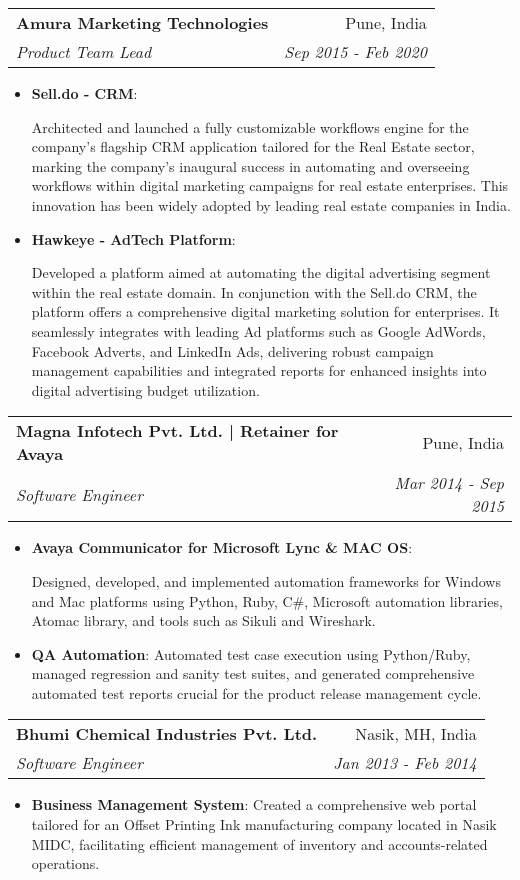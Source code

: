 \documentclass[letterpaper,11pt]{article}
\makeatletter
\newcommand{\resumeItem}[2]{
  \item\small{
    \textbf{#1}{: #2 \vspace{-2pt}}
  }
}
\newcommand{\resumeSubheading}[4]{
  \vspace{-1pt}\item
    \begin{tabular*}{0.97\textwidth}[t]{l@{\extracolsep{\fill}}r}
      \textbf{#1} & #2 \\
      \textit{\small#3} & \textit{\small #4} \\
    \end{tabular*}\vspace{-5pt}
}
\newcommand{\resumeSubSubheading}[2]{
    \begin{tabular*}{0.97\textwidth}{l@{\extracolsep{\fill}}r}
      \textit{\small#1} & \textit{\small #2} \\
    \end{tabular*}\vspace{-5pt}
}
\newcommand{\resumeSubHeadingListEnd}{\end{itemize}}
\newcommand{\resumeItemListStart}{\begin{itemize}}
\newcommand{\resumeItemListEnd}{\end{itemize}\vspace{-5pt}}
\makeatother
\begin{document}
    \resumeSubheading
      {Amura Marketing Technologies}{Pune, India}
      {Product Team Lead}{Sep 2015 - Feb 2020}
      \resumeItemListStart
        \resumeItem{Sell.do - CRM} \newline
          {Architected and launched a fully customizable workflows engine for the company's flagship CRM application tailored for the Real Estate sector, marking the company's inaugural success in automating and overseeing workflows within digital marketing campaigns for real estate enterprises. This innovation has been widely adopted by leading real estate companies in India.}
        \resumeItem{Hawkeye - AdTech Platform} \newline
          {Developed a platform aimed at automating the digital advertising segment within the real estate domain. In conjunction with the Sell.do CRM, the platform offers a comprehensive digital marketing solution for enterprises. It seamlessly integrates with leading Ad platforms such as Google AdWords, Facebook Adverts, and LinkedIn Ads, delivering robust campaign management capabilities and integrated reports for enhanced insights into digital advertising budget utilization.}
      \resumeItemListEnd


    \resumeSubheading
      {Magna Infotech Pvt. Ltd. | Retainer for Avaya}{Pune, India}
      {Software Engineer}{Mar 2014 - Sep 2015}
      \resumeItemListStart
        \resumeItem{Avaya Communicator for Microsoft Lync \& MAC OS} \newline
          {Designed, developed, and implemented automation frameworks for Windows and Mac platforms using Python, Ruby, C\#, Microsoft automation libraries, Atomac library, and tools such as Sikuli and Wireshark.}
        \resumeItem{QA Automation}
          {Automated test case execution using Python/Ruby, managed regression and sanity test suites, and generated comprehensive automated test reports crucial for the product release management cycle.}
      \resumeItemListEnd

    \resumeSubheading
      {Bhumi Chemical Industries Pvt. Ltd.}{Nasik, MH, India}
      {Software Engineer}{Jan 2013 - Feb 2014}
      \resumeItemListStart
        \resumeItem{Business Management System}
          {Created a comprehensive web portal tailored for an Offset Printing Ink manufacturing company located in Nasik MIDC, facilitating efficient management of inventory and accounts-related operations.}
      \resumeItemListEnd
\end{document}
